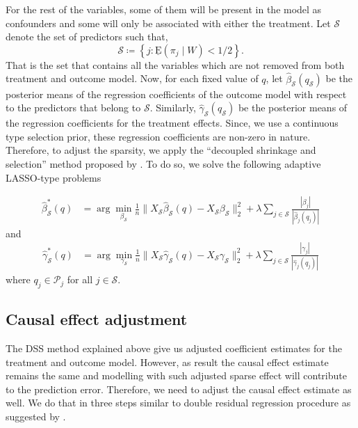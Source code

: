 \documentclass{amsart}
\newcommand{\lexp}{\underline{\text{E}}}
\begin{document}
For the rest of the variables, some of them will be present
in the model as confounders and some will only be associated with
either the treatment. Let $\mathcal{S}$ denote the set of
predictors such that,
\begin{equation}
    \mathcal{S}\coloneqq
    \left\{j : \lexp(\pi_j\mid W) < 1/2\right\}.
\end{equation}
That is the set that contains all the variables which are not
removed from both treatment and outcome model. Now, for
each fixed value of $q$,
let $\hat{\beta}_{\mathcal{S}}(q_{\mathcal{S}})$ be the posterior means of the regression coefficients of the outcome model with respect to
the predictors that belong to $\mathcal{S}$. Similarly,
$\hat{\gamma}_{\mathcal{S}}(q_{\mathcal{S}})$ be the posterior means of the regression
coefficients for the treatment effects. Since, we use a continuous type
selection prior, these regression coefficients are non-zero in nature.
Therefore, to adjust the sparsity, we apply the 
``decoupled shrinkage and selection'' method proposed by \citet{hahn2015}. To do so, we solve the following adaptive LASSO-type \cite{Zou2006}
problems

\begin{align}
    \hat{\beta}^*_{\mathcal{S}}(q) &= 
    \arg\min_{\beta_{\mathcal{S}}} \frac{1}{n}\|X_{\mathcal{S}}\hat{\beta}_{\mathcal{S}}(q)
    - X_{\mathcal{S}} \beta_{\mathcal{S}}\|_2^2 + \lambda\sum_{j\in\mathcal{S}} 
    \frac{|\beta_j|}{|\hat{\beta}_j(q_j)|}
\end{align}
and
\begin{align}
    \hat{\gamma}^*_{\mathcal{S}}(q) &= 
    \arg\min_{\gamma_{\mathcal{S}}} \frac{1}{n}\|X_{\mathcal{S}}\hat{\gamma}_{\mathcal{S}}(q)
    - X_{\mathcal{S}} \gamma_{\mathcal{S}}\|_2^2 + \lambda\sum_{j\in\mathcal{S}} 
    \frac{|\gamma_j|}{|\hat{\gamma}_j(q_j)|}
\end{align}
where $q_{j}\in \mathcal{P}_{j}$ for all $j\in\mathcal{S}$.

\iftrue
\subsection{Causal effect adjustment} The DSS method explained
above give us adjusted coefficient estimates for the treatment
and outcome model. However, as result the causal effect estimate
remains the same and modelling with such adjusted sparse effect 
will contribute to the prediction error. Therefore, we need to 
adjust the causal effect estimate as well. We do that in three steps
similar to double residual regression procedure as suggested by
\citet{robinson1988}.
\end{document}
